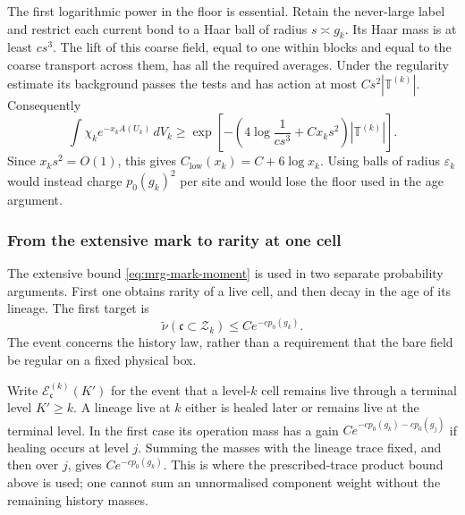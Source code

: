 \documentclass[11pt,letterpaper,reqno]{amsart}
\theoremstyle{definition}
\theoremstyle{remark}
\begin{document}
The first logarithmic power in the floor is
essential. Retain the never-large label and
restrict each current bond to a Haar ball of
radius $s\asymp g_k$. Its Haar mass is at least
$cs^3$. The lift of this coarse field, equal
to one within blocks and equal to the coarse
transport across them, has all the required
averages. Under the regularity estimate its
background passes the tests and has action at
most $Cs^2|\mathbb T^{(k)}|$. Consequently
\[
 \int\chi_k e^{-x_kA(U_k)}\,dV_k
 \ge\exp\!\left[-\left(4\log\frac1{cs^3}
                        +Cx_ks^2\right)
                        |\mathbb T^{(k)}|\right].
\]
Since $x_ks^2=O(1)$, this gives
$C_{\mathrm{low}}(x_k)=C+6\log x_k$.
Using balls of radius $\varepsilon_k$ would
instead charge $p_0(g_k)^2$ per site and
would lose the floor used in the age argument.

\subsubsection*{From the extensive mark to rarity at one cell}

The extensive bound \eqref{eq:mrg-mark-moment} is used in two
separate probability arguments. First one obtains rarity of a live
cell, and then decay in the age of its lineage. The first target is
\begin{equation}\label{eq:xrg-live-rarity}
 \widetilde\nu(\mathfrak c\subset\mathcal Z_k)
                 \le Ce^{-cp_0(g_k)}.
\end{equation}
The event concerns the history law, rather than a requirement that
the bare field be regular on a fixed physical box.

Write $\mathcal E_{\mathfrak c}^{(k)}(K')$ for the event that a
level-$k$ cell remains live through a terminal level $K'\ge k$.
A lineage live at $k$ either is healed later or remains live at the
terminal level. In the first case its operation mass has a gain
$Ce^{-cp_0(g_k)-cp_0(g_j)}$ if healing occurs at level $j$.
Summing the masses with the lineage trace fixed, and then over $j$,
gives $Ce^{-cp_0(g_k)}$. This is where the prescribed-trace
product bound above is used; one cannot sum an unnormalised
component weight without the remaining history masses.
\end{document}
